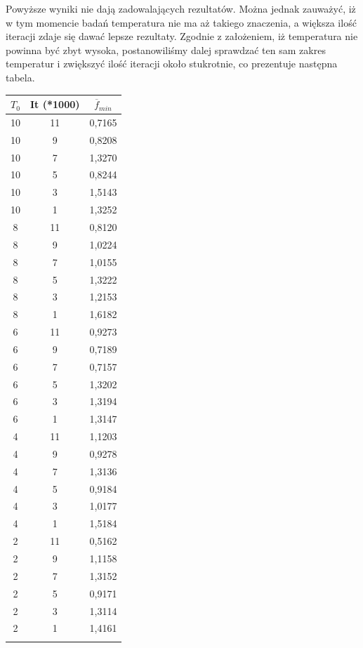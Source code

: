 \documentclass[twoside]{projektInzynierskiMS1}
\newcommand{\si}{ś}
\begin{document}
Powyższe wyniki nie dają zadowalających rezultatów. Można jednak zauważyć, iż w tym momencie badań temperatura nie ma aż takiego znaczenia, a większa ilo\si ć iteracji zdaje się dawać lepsze rezultaty. Zgodnie z założeniem, iż temperatura nie powinna być zbyt wysoka, postanowili\si my dalej sprawdzać ten sam zakres temperatur i zwiększyć ilo\si ć iteracji około stukrotnie, co prezentuje następna tabela.


\begin{tabular}{|c|c|c|} 
                  \hline
                   \textbf{$T_0$}
                  & \textbf{It (*1000)}
                  &\textbf{$\overline{f}_{min}$}\\ \hline


10 & 11 & 0,7165\\ \hline 
10 & 9 & 0,8208 \\ \hline 
10 & 7 & 1,3270 \\ \hline 
10 & 5 & 0,8244 \\ \hline 
10 & 3 & 1,5143 \\ \hline 
10 & 1 & 1,3252 \\ \Xhline{3\arrayrulewidth}

8 & 11 & 0,8120 \\ \hline 
8 & 9 & 1,0224 \\ \hline 
8 & 7 & 1,0155 \\ \hline 
8 & 5 & 1,3222 \\ \hline 
8 & 3 & 1,2153 \\ \hline 
8 & 1 & 1,6182 \\ \Xhline{3\arrayrulewidth}


6 & 11 & 0,9273 \\ \hline 
6 & 9 & 0,7189 \\ \hline 
6 & 7 & 0,7157 \\ \hline 
6 & 5 & 1,3202 \\ \hline 
6 & 3 & 1,3194 \\ \hline 
6 & 1 & 1,3147 \\ \Xhline{3\arrayrulewidth}


4 & 11 & 1,1203 \\ \hline 
4 & 9 & 0,9278 \\ \hline 
4 & 7 & 1,3136 \\ \hline 
4 & 5 & 0,9184 \\ \hline 
4 & 3 & 1,0177 \\ \hline 
4 & 1 & 1,5184 \\ \Xhline{3\arrayrulewidth}

2 & 11 & 0,5162 \\ \hline 
2 & 9 & 1,1158 \\ \hline 
2 & 7 & 1,3152 \\ \hline 
2 & 5 & 0,9171 \\ \hline 
2 & 3 & 1,3114 \\ \hline 
2 & 1 & 1,4161 \\ \Xhline{3\arrayrulewidth}


\end{tabular} \\
\end{document}
